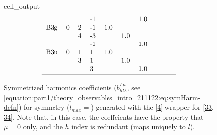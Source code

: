 \documentclass[letterpaper,table,10pt,english]{jupyterBook}
\begin{document}
\begin{figure}[htbp]
\begin{sphinxVerbatimOutput}
\begin{sphinxuseclass}{cell_output}
\begin{equation*}
\begin{split}
\begin{tabular}{llllllllll}
    &   &   & -1 &      &      &  1.0 &      &      &      \\
B3g & 0 & 2 & -1 &  1.0 &      &      &      &      &      \\
    &   & 4 & -3 &      &  1.0 &      &      &      &      \\
    &   &   & -1 &      &      &  1.0 &      &      &      \\
B3u & 0 & 1 &  1 &  1.0 &      &      &      &      &      \\
    &   & 3 &  1 &      &  1.0 &      &      &      &      \\
    &   &   &  3 &      &      &  1.0 &      &      &      \\
\bottomrule
\end{tabular}\end{split}
\end{equation*}
\end{sphinxuseclass}\end{sphinxVerbatimOutput}
\caption{Symmetrized harmonics coefficients (\(b_{hl\lambda}^{\Gamma\mu}\), see \eqref{equation:part1/theory_observables_intro_211122:eq:symHarm-defn}) for  symmetry (\(l_{max}=\)) generated with the  {[}\hyperlink{cite.backmatter/bibliography:id574}{4}{]} wrapper for  {[}\hyperlink{cite.backmatter/bibliography:id593}{33}, \hyperlink{cite.backmatter/bibliography:id594}{34}{]}. Note that, in this case, the coeffcients have the property that \(\mu=0\) only, and the \(h\) index is redundant (maps uniquely to \(l\)).}\label{\detokenize{part1/theory_tensor_formalism_201122:tab-d2hxlm}}\end{figure}
\end{document}
